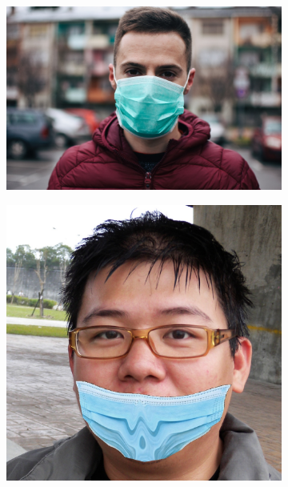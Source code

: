 \begin{figure}[htp]
\begin{subfigure}{0.2\linewidth}
		\caption{}
		\label{fig:1f}
	\end{subfigure}
	\newline
	\begin{subfigure}{0.2\linewidth}
		\includegraphics[width=\linewidth]{imagenes/dataset1-7.jpg} 
		\caption{}
		\label{fig:1g}
	\end{subfigure}\hfill
	\begin{subfigure}{0.2\linewidth}
		\includegraphics[width=\linewidth]{imagenes/dataset1-8.jpg}
		\caption{}
		\label{fig:1h}
	\end{subfigure}\hfill	

\end{figure}
